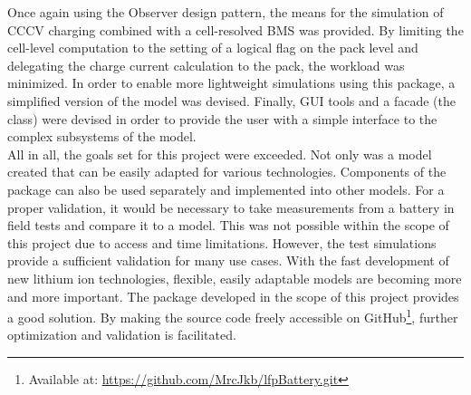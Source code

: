 Once again using the Observer design pattern, the means for the simulation of CCCV charging combined with a cell-resolved BMS was provided. By limiting the cell-level computation to the setting of a logical flag on the pack level and delegating the charge current calculation to the pack, the workload was minimized. In order to enable more lightweight simulations using this package, a simplified version of the model was devised. Finally, GUI tools and a facade (the  class) were devised in order to provide the user with a simple interface to the complex subsystems of the model.\\
All in all, the goals set for this project were exceeded. Not only was a model created that can be easily adapted for various technologies. Components of the package can also be used separately and implemented into other models. For a proper validation, it would be necessary to take measurements from a battery in field tests and compare it to a model. This was not possible within the scope of this project due to access and time limitations. However, the test simulations provide a sufficient validation for many use cases. With the fast development of new lithium ion technologies, flexible, easily adaptable models are becoming more and more important. The package developed in the scope of this project provides a good solution. By making the source code freely accessible on GitHub\footnote{Available at: \url{https://github.com/MrcJkb/lfpBattery.git}}, further optimization and validation is facilitated.
\clearpage

